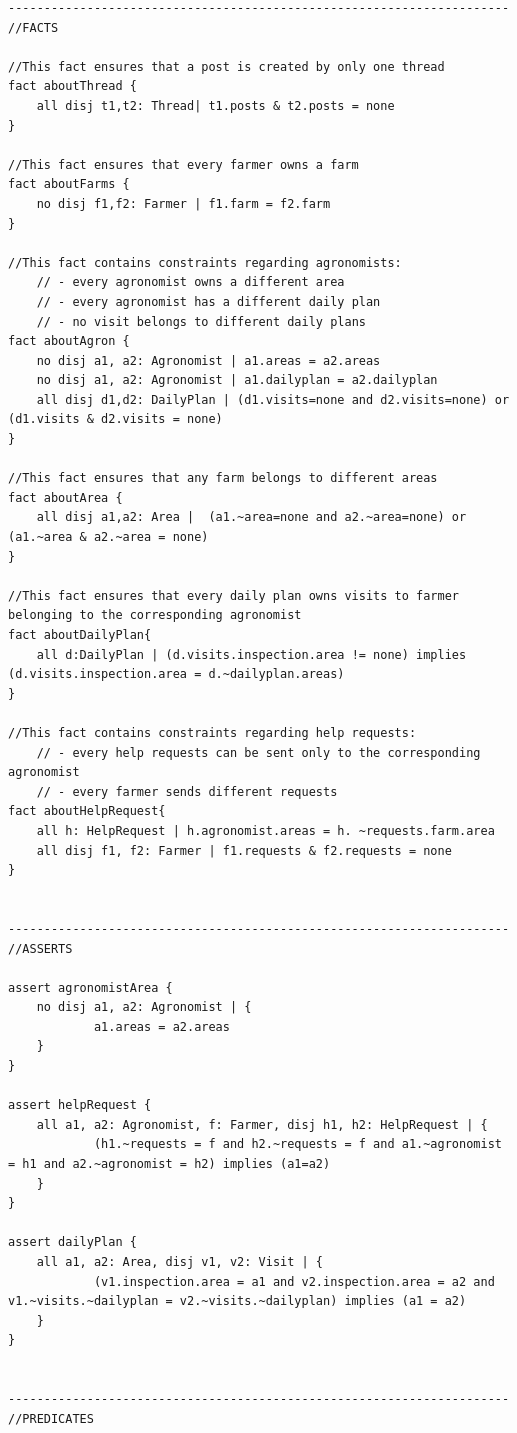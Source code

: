\begin{lstlisting}[language=alloy]
----------------------------------------------------------------------
//FACTS

//This fact ensures that a post is created by only one thread
fact aboutThread {
	all disj t1,t2: Thread| t1.posts & t2.posts = none
}

//This fact ensures that every farmer owns a farm
fact aboutFarms {
	no disj f1,f2: Farmer | f1.farm = f2.farm
}

//This fact contains constraints regarding agronomists:
	// - every agronomist owns a different area
	// - every agronomist has a different daily plan
	// - no visit belongs to different daily plans
fact aboutAgron {
	no disj a1, a2: Agronomist | a1.areas = a2.areas
	no disj a1, a2: Agronomist | a1.dailyplan = a2.dailyplan
	all disj d1,d2: DailyPlan | (d1.visits=none and d2.visits=none) or (d1.visits & d2.visits = none)
}

//This fact ensures that any farm belongs to different areas
fact aboutArea {
	all disj a1,a2: Area |  (a1.~area=none and a2.~area=none) or (a1.~area & a2.~area = none)
}

//This fact ensures that every daily plan owns visits to farmer belonging to the corresponding agronomist
fact aboutDailyPlan{
	all d:DailyPlan | (d.visits.inspection.area != none) implies (d.visits.inspection.area = d.~dailyplan.areas)
}

//This fact contains constraints regarding help requests:
	// - every help requests can be sent only to the corresponding agronomist
	// - every farmer sends different requests
fact aboutHelpRequest{
  	all h: HelpRequest | h.agronomist.areas = h. ~requests.farm.area
  	all disj f1, f2: Farmer | f1.requests & f2.requests = none
}


----------------------------------------------------------------------
//ASSERTS

assert agronomistArea {
  	no disj a1, a2: Agronomist | {
    		a1.areas = a2.areas
  	}
}

assert helpRequest {
  	all a1, a2: Agronomist, f: Farmer, disj h1, h2: HelpRequest | {
    		(h1.~requests = f and h2.~requests = f and a1.~agronomist = h1 and a2.~agronomist = h2) implies (a1=a2)
  	}
}

assert dailyPlan {
  	all a1, a2: Area, disj v1, v2: Visit | {
    		(v1.inspection.area = a1 and v2.inspection.area = a2 and v1.~visits.~dailyplan = v2.~visits.~dailyplan) implies (a1 = a2)
  	}
}


----------------------------------------------------------------------
//PREDICATES


\end{lstlisting}
